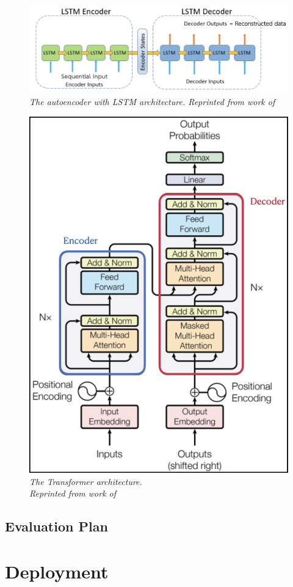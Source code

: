 \begin{figure}[H]
  \centering
  \caption[The autoencoder with LSTM architecture.]{\emph{The autoencoder with LSTM architecture. Reprinted from work of \citeauthor{battula_2019} \citeyear{battula_2019}}}\label{fig:LSTM_metho}
  \includegraphics[scale = 0.3]{figures/LSTM_metho.jpg}  
\end{figure}

\begin{figure}[H]
  \centering
  \caption[The Transformer architecture.]{\emph{The Transformer architecture. \\ Reprinted from work of \citeauthor{vaswani_shazeer_parmar_uszkoreit_jones_n_gomez_kaiser_polosukhin_2017} \citeyear{vaswani_shazeer_parmar_uszkoreit_jones_n_gomez_kaiser_polosukhin_2017}}}\label{fig:transformer_metho}
  \includegraphics[scale = 0.3]{figures/transformer_metho.jpg}  
\end{figure}

 
\subsection{Evaluation Plan}
\section{Deployment}

\FloatBarrier
